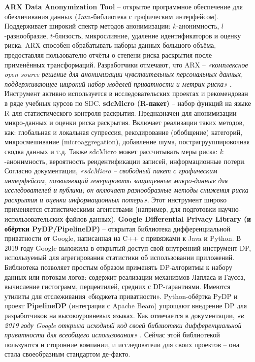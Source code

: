 \textbf{ARX Data Anonymization Tool} – открытое программное обеспечение для обезличивания данных (Java-библиотека с графическим интерфейсом). Поддерживает широкий спектр методов анонимизации: $k$-анонимность, $l$-разнообразие, $t$-близость, микрослияние, удаление идентификаторов и оценку риска. ARX способен обрабатывать наборы данных большого объёма, предоставляя пользователю отчёты о степени риска раскрытия после применённых трансформаций. Разработчики отмечают, что ARX – \textit{«комплексное open source решение для анонимизации чувствительных персональных данных, поддерживающее широкий набор моделей приватности и метрик риска»} \autocite{arx-deidentifier-org}. Инструмент активно используется в исследовательских проектах и рекомендован в ряде учебных курсов по SDC.
\textbf{sdcMicro (R-пакет)} – набор функций на языке R для статистического контроля раскрытия. Предназначен для анонимизации микро-данных и оценки риска раскрытия. Включает реализации таких методов, как: глобальная и локальная супрессия, рекодирование (обобщение) категорий, микросмешивание (microaggregation), добавление шума, пострагрууппировочная сводка данных и т.д. Также sdcMicro может рассчитывать меры риска: $k$-анонимность, вероятность реидентификации записей, информационные потери. Согласно документации, \textit{«sdcMicro – свободный пакет с графическим интерфейсом, позволяющий генерировать защищенные микро-данные для исследователей и публики; он включает разнообразные методы снижения риска раскрытия и оценки информационных потерь»}. Этот инструмент широко применяется статистическими агентствами (например, для подготовки научно-использовательских файлов данных).
\textbf{Google Differential Privacy Library (и обёртки PyDP/PipelineDP)} – открытая библиотека дифференциальной приватности от Google, написанная на C++ с привязками к Java и Python. В 2019 году Google выложила в открытый доступ свой внутренний инструмент DP, используемый для агрегирования статистики об использовании приложений. Библиотека позволяет простым образом применять DP-алгоритмы к набору данных или потокам логов: содержит реализации механизмов Лапласа и Гаусса, вычисление гистограмм, перцентилей, средних с DP-гарантиями. Имеются утилиты для отслеживания «бюджета приватности». Python-обёртка PyDP и проект \textbf{PipelineDP} (интеграция с Apache Beam) упрощают внедрение DP для разработчиков на высокоуровневых языках. Как отмечается в документации, \textit{«в 2019 году Google открыла исходный код своей библиотеки дифференциальной приватности для всеобщего использования»} \autocite{pydp-readthedocs-io}. Сейчас этой библиотекой пользуются и сторонние компании, и исследователи для своих проектов – она стала своеобразным стандартом де-факто.
